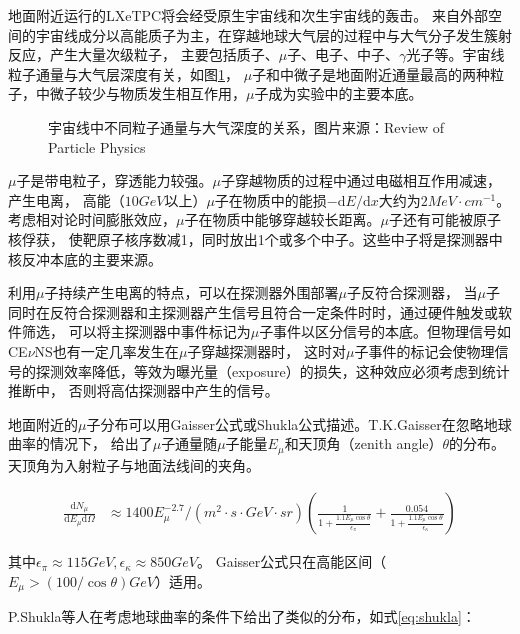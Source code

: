 地面附近运行的LXeTPC将会经受原生宇宙线和次生宇宙线的轰击。
来自外部空间的宇宙线成分以高能质子为主，在穿越地球大气层的过程中与大气分子发生簇射反应，产生大量次级粒子，
主要包括质子、$\mu$子、电子、中子、$\gamma$光子等。宇宙线粒子通量与大气层深度有关，如图\ref{fig:vertical_flux}，
$\mu$子和中微子是地面附近通量最高的两种粒子，中微子较少与物质发生相互作用，$\mu$子成为实验中的主要本底。

\begin{figure}
    \centering
    
    \caption{\label{fig:vertical_flux} 宇宙线中不同粒子通量与大气深度的关系，图片来源：Review of Particle Physics\cite{olive_review_2016}}
\end{figure}

$\mu$子是带电粒子，穿透能力较强。$\mu$子穿越物质的过程中通过电磁相互作用减速，产生电离，
高能（$10\si{GeV}$以上）$\mu$子在物质中的能损$-\mathrm{d}E/\mathrm{d}x$大约为$2\si{MeV\cdot cm^{-1}}$。
考虑相对论时间膨胀效应，$\mu$子在物质中能够穿越较长距离。$\mu$子还有可能被原子核俘获，
使靶原子核序数减1，同时放出1个或多个中子\cite{wang_predicting_2001}。这些中子将是探测器中核反冲本底的主要来源。

利用$\mu$子持续产生电离的特点，可以在探测器外围部署$\mu$子反符合探测器，
当$\mu$子同时在反符合探测器和主探测器产生信号且符合一定条件时时，通过硬件触发或软件筛选，
可以将主探测器中事件标记为$\mu$子事件以区分信号的本底。但物理信号如CE$\nu$NS也有一定几率发生在$\mu$子穿越探测器时，
这时对$\mu$子事件的标记会使物理信号的探测效率降低，等效为曝光量（exposure）的损失，这种效应必须考虑到统计推断中，
否则将高估探测器中产生的信号。

地面附近的$\mu$子分布可以用Gaisser公式或Shukla公式描述。T.K.Gaisser在忽略地球曲率的情况下，
给出了$\mu$子通量随$\mu$子能量$E_\mu$和天顶角（zenith angle）$\theta$的分布。天顶角为入射粒子与地面法线间的夹角\cite{gaisser_cosmic_2016}。

\begin{align}
    \label{eq:gaisser}
    \frac{\mathrm{d}N_\mu}{\mathrm{d}E_\mu\mathrm{d}\Omega} &\approx 
    1400E_\mu^{-2.7}/\left(\si{m^2\cdot s\cdot GeV\cdot sr}\right)\left(\frac{1}{1+\frac{1.1E_\mu\cos\theta}{\epsilon_\pi}}+\frac{0.054}{1+\frac{1.1E_\mu\cos\theta}{\epsilon_\kappa}}\right)
\end{align}

其中$\epsilon_\pi\approx115\si{GeV},\epsilon_\kappa\approx850\si{GeV}$。
Gaisser公式只在高能区间（$E_\mu>(100/\cos\theta)\si{GeV}$）适用。

P.Shukla等人在考虑地球曲率的条件下给出了类似的分布\cite{shukla_energy_2018}，如式\ref{eq:shukla}：

